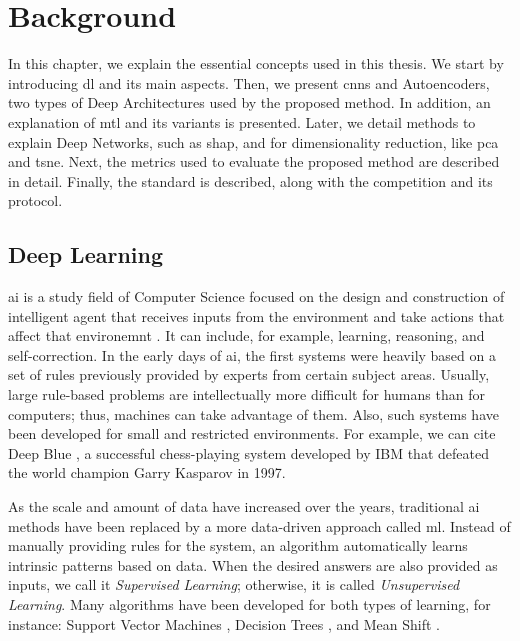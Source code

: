 \section{Background} \label{sec:background}

In this chapter, we explain the essential concepts used in this thesis. We start by introducing \acl{dl} and its main aspects. Then, we present \aclp{cnn} and Autoencoders, two types of Deep Architectures used by the proposed method. In addition, an explanation of \acl{mtl} and its variants is presented. Later, we detail methods to explain Deep Networks, such as \acs{shap}, and for dimensionality reduction, like \acl{pca} and \acs{tsne}. Next, the metrics used to evaluate the proposed method are described in detail. Finally, the \icao standard is described, along with the \fvcongoing competition and its protocol.

\subsection{Deep Learning}

\acf{ai} is a study field of Computer Science focused on the design and construction of intelligent agent that receives inputs from the environment and take actions that affect that environemnt \citep{russell}. It can include, for example, learning, reasoning, and self-correction. In the early days of \acs{ai}, the first systems were heavily based on a set of rules previously provided by experts from certain subject areas. Usually, large rule-based problems are intellectually more difficult for humans than for computers; thus, machines can take advantage of them. Also, such systems have been developed for small and restricted environments. For example, we can cite Deep Blue \citep{hsu2002behind}, a successful chess-playing system developed by IBM that defeated the world champion Garry Kasparov in 1997.

As the scale and amount of data have increased over the years, traditional \acs{ai} methods have been replaced by a more data-driven approach called \acf{ml}. Instead of manually providing rules for the system, an algorithm automatically learns intrinsic patterns based on data. When the desired answers are also provided as inputs, we call it \textit{Supervised Learning}; otherwise, it is called \textit{Unsupervised Learning}. Many algorithms have been developed for both types of learning, for instance: Support Vector Machines \citep{boser1992training}, Decision Trees \citep{breiman1984classification}, and Mean Shift \citep{fukunaga1975estimation}. 

